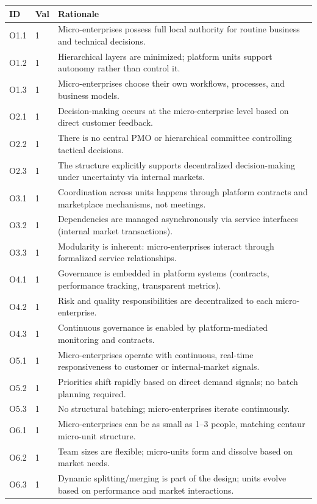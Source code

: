 \documentclass[11pt, a4paper, twocolumn]{article} %
\begin{document}
\begin{table}[h]
\centering
\begingroup\small
\setlength{\tabcolsep}{4pt}%
\begin{tabularx}{\linewidth}{llX}
\toprule
\textbf{ID} & \textbf{Val} & \textbf{Rationale} \\
\midrule
O1.1 & 1 &
Micro-enterprises possess full local authority for routine business and technical decisions. \\
O1.2 & 1 &
Hierarchical layers are minimized; platform units support autonomy rather than control it. \\
O1.3 & 1 &
Micro-enterprises choose their own workflows, processes, and business models. \\
\midrule
O2.1 & 1 &
Decision-making occurs at the micro-enterprise level based on direct customer feedback. \\
O2.2 & 1 &
There is no central PMO or hierarchical committee controlling tactical decisions. \\
O2.3 & 1 &
The structure explicitly supports decentralized decision-making under uncertainty via internal markets. \\
\midrule
O3.1 & 1 &
Coordination across units happens through platform contracts and marketplace mechanisms, not meetings. \\
O3.2 & 1 &
Dependencies are managed asynchronously via service interfaces (internal market transactions). \\
O3.3 & 1 &
Modularity is inherent: micro-enterprises interact through formalized service relationships. \\
\midrule
O4.1 & 1 &
Governance is embedded in platform systems (contracts, performance tracking, transparent metrics). \\
O4.2 & 1 &
Risk and quality responsibilities are decentralized to each micro-enterprise. \\
O4.3 & 1 &
Continuous governance is enabled by platform-mediated monitoring and contracts. \\
\midrule
O5.1 & 1 &
Micro-enterprises operate with continuous, real-time responsiveness to customer or internal-market signals. \\
O5.2 & 1 &
Priorities shift rapidly based on direct demand signals; no batch planning required. \\
O5.3 & 1 &
No structural batching; micro-enterprises iterate continuously. \\
\midrule
O6.1 & 1 &
Micro-enterprises can be as small as 1--3 people, matching centaur micro-unit structure. \\
O6.2 & 1 &
Team sizes are flexible; micro-units form and dissolve based on market needs. \\
O6.3 & 1 &
Dynamic splitting/merging is part of the design; units evolve based on performance and market interactions. \\
\bottomrule
\end{tabularx}
\endgroup
\end{table}
\end{document}
